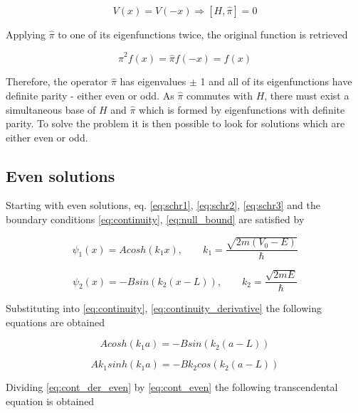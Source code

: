 \documentclass{article}
\begin{document}
\begin{equation}
\label{eq:parity_commutation}
V(x) = V(-x) \Rightarrow \left[H,\hat{\pi} \right] = 0
\end{equation}

Applying \(\hat{\pi}\) to one of its eigenfunctions twice, the original function is retrieved

\begin{equation}
\hat{\pi}^2f(x) = \hat{\pi}f(-x) = f(x)
\end{equation}

Therefore, the operator \(\hat{\pi}\) has eigenvalues \(\pm\) 1 and all of its eigenfunctions have definite parity - either even or odd. As \(\hat{\pi}\) commutes with \(H\), there must exist a simultaneous base of \(H\) and \(\hat{\pi}\) which is formed by eigenfunctions with definite parity. To solve the problem it is then possible to look for solutions which are either even or odd.

\subsection{Even solutions}
Starting with even solutions, eq. \eqref{eq:schr1}, \eqref{eq:schr2}, \eqref{eq:schr3} and the boundary conditions \eqref{eq:continuity}, \eqref{eq:null_bound} are satisfied by

\begin{equation}
\psi_{1}(x) = A cosh(k_{1} x), \qquad k_{1} = \frac{\sqrt{2m(V_{0} - E)}}{\hbar}
\end{equation}

\begin{equation}
\psi_{2}(x) = - B sin(k_{2}(x-L)), \qquad k_{2} = \frac{\sqrt{2mE}}{\hbar}
\end{equation}

Substituting into \eqref{eq:continuity}, \eqref{eq:continuity_derivative} the following equations are obtained

\begin{equation}
\label{eq:cont_even}
A cosh(k_{1}a) =  - B sin(k_{2}(a-L))
\end{equation}

\begin{equation}
\label{eq:cont_der_even}
A k_{1} sinh(k_{1}a) = - B k_{2} cos(k_{2}(a-L))
\end{equation}

Dividing \eqref{eq:cont_der_even} by \eqref{eq:cont_even} the following transcendental equation is obtained
\end{document}
